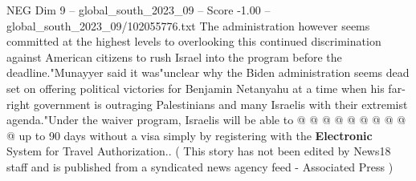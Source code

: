 \begin{textsample}{NEG Dim 9 – global\_south\_2023\_09 – Score -1.00 – global\_south\_2023\_09/102055776.txt}
The administration however seems committed at the highest levels to overlooking this continued discrimination against American citizens to rush Israel into the program before the deadline."Munayyer said it was"unclear why the Biden administration seems dead set on offering political victories for Benjamin Netanyahu at a time when his far-right government is outraging Palestinians and many Israelis with their extremist agenda."Under the waiver program, Israelis will be able to @ @ @ @ @ @ @ @ @ @ up to 90 days without a visa simply by registering with the \textbf{Electronic} System for Travel Authorization.. ( This story has not been edited by News18 staff and is published from a syndicated news agency feed - Associated Press )

\end{textsample}
